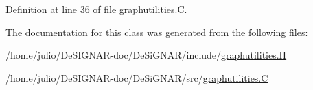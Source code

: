 Definition at line 36 of file graphutilities.\+C.



The documentation for this class was generated from the following files\+:\begin{DoxyCompactItemize}
\item 
/home/julio/\+De\+S\+I\+G\+N\+A\+R-\/doc/\+De\+Si\+G\+N\+A\+R/include/\hyperlink{graphutilities_8_h}{graphutilities.\+H}\item 
/home/julio/\+De\+S\+I\+G\+N\+A\+R-\/doc/\+De\+Si\+G\+N\+A\+R/src/\hyperlink{graphutilities_8_c}{graphutilities.\+C}\end{DoxyCompactItemize}
